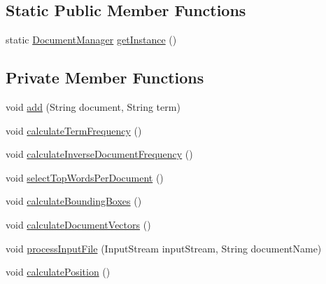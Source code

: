 \subsection*{Static Public Member Functions}
\begin{DoxyCompactItemize}
\item 
static \mbox{\hyperlink{classio_1_1github_1_1syzygy2048_1_1radcloud_1_1_document_manager}{Document\+Manager}} \mbox{\hyperlink{classio_1_1github_1_1syzygy2048_1_1radcloud_1_1_document_manager_abb1a711c0690a259a1081c573396b84a}{get\+Instance}} ()
\end{DoxyCompactItemize}
\subsection*{Private Member Functions}
\begin{DoxyCompactItemize}
\item 
void \mbox{\hyperlink{classio_1_1github_1_1syzygy2048_1_1radcloud_1_1_document_manager_aecdf1d11ec1b9a2db9cdb0f60b1c1184}{add}} (String document, String term)
\item 
void \mbox{\hyperlink{classio_1_1github_1_1syzygy2048_1_1radcloud_1_1_document_manager_adcf3b63232181ceb86abc91a5a37cf0f}{calculate\+Term\+Frequency}} ()
\item 
void \mbox{\hyperlink{classio_1_1github_1_1syzygy2048_1_1radcloud_1_1_document_manager_aa220917ccab9869414a201361ba1e1a9}{calculate\+Inverse\+Document\+Frequency}} ()
\item 
void \mbox{\hyperlink{classio_1_1github_1_1syzygy2048_1_1radcloud_1_1_document_manager_a9b7a1e94d648221841ecc5d5c5650f0b}{select\+Top\+Words\+Per\+Document}} ()
\item 
void \mbox{\hyperlink{classio_1_1github_1_1syzygy2048_1_1radcloud_1_1_document_manager_a7418a74e1d0a3a7677875d525a12b2f1}{calculate\+Bounding\+Boxes}} ()
\item 
void \mbox{\hyperlink{classio_1_1github_1_1syzygy2048_1_1radcloud_1_1_document_manager_a7c3bd4342ae38a0876b0fecdddf95de7}{calculate\+Document\+Vectors}} ()
\item 
void \mbox{\hyperlink{classio_1_1github_1_1syzygy2048_1_1radcloud_1_1_document_manager_a9fab6a75480c9f0aa1fa2085359dd8fa}{process\+Input\+File}} (Input\+Stream input\+Stream, String document\+Name)
\item 
void \mbox{\hyperlink{classio_1_1github_1_1syzygy2048_1_1radcloud_1_1_document_manager_a42be8000ada29b9f9a45a48f0804f760}{calculate\+Position}} ()
\item 

\end{DoxyCompactItemize}
